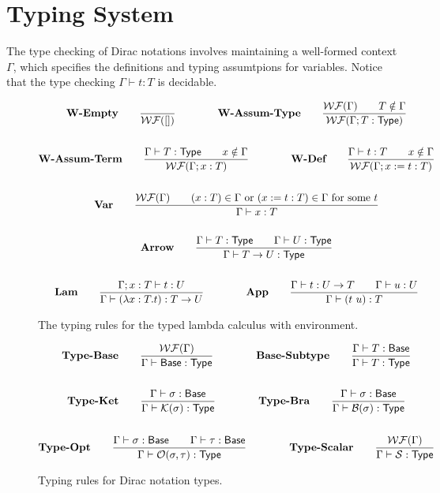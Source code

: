 \documentclass{article}
\begin{document}
\section{Typing System}
The type checking of Dirac notations involves maintaining a well-formed context $\Gamma$, which specifies the definitions and typing assumtpions for variables.
Notice that the type checking $\Gamma \vdash t : T$ is decidable.
\begin{figure}[h]
    \begin{gather*}
        \textbf{W-Empty} \qquad
        \frac{}{\mathcal{WF}([])}
        \qquad \qquad
        \textbf{W-Assum-Type} \qquad
        \frac{\mathcal{WF}(\Gamma) \qquad T \notin \Gamma}{\mathcal{WF}(\Gamma; T:\mathsf{Type})}\\
        \\
        \textbf{W-Assum-Term} \qquad
        \frac{\Gamma\vdash T:\mathsf{Type} \qquad x \notin \Gamma}{\mathcal{WF}(\Gamma; x:T)}
        \qquad \qquad
        \textbf{W-Def} \qquad
        \frac{\Gamma\vdash t:T \qquad x \notin \Gamma}{\mathcal{WF}(\Gamma; x:=t:T)} \\
        \\
        \textbf{Var} \qquad
        \frac{\mathcal{WF}(\Gamma) \qquad (x:T) \in \Gamma \text{ or } (x := t : T) \in \Gamma \text{ for some $t$}}{\Gamma \vdash x : T} \\
        \\
        \textbf{Arrow} \qquad
        \frac{\Gamma \vdash T:\mathsf{Type} \qquad \Gamma \vdash U:\mathsf{Type}}{\Gamma \vdash T \to U : \mathsf{Type}} \\
        \\
        \textbf{Lam} \qquad
        \frac{\Gamma;x:T \vdash t : U}{\Gamma \vdash (\lambda x:T . t) : T \to U}
        \qquad \qquad
        \textbf{App} \qquad
        \frac{\Gamma \vdash t:U \to T \qquad \Gamma \vdash u:U}{\Gamma \vdash (t\ u):T}
    \end{gather*}
    \caption{The typing rules for the typed lambda calculus with environment.}
\end{figure}

\begin{figure}[h]
    \begin{gather*}
        \textbf{Type-Base} \qquad
        \frac{\mathcal{WF}(\Gamma)}{\Gamma \vdash \mathsf{Base} : \mathsf{Type}} 
        \qquad \qquad
        \textbf{Base-Subtype} \qquad
        \frac{\Gamma \vdash T : \mathsf{Base}}{\Gamma \vdash T : \mathsf{Type}} \\
        \\
        \textbf{Type-Ket} \qquad
        \frac{\Gamma \vdash \sigma : \mathsf{Base}}{\Gamma \vdash \mathcal{K}(\sigma) : \mathsf{Type}}
        \qquad \qquad
        \textbf{Type-Bra} \qquad
        \frac{\Gamma \vdash \sigma : \mathsf{Base}}{\Gamma \vdash \mathcal{B}(\sigma) : \mathsf{Type}} \\
        \\
        \textbf{Type-Opt} \qquad
        \frac{\Gamma \vdash \sigma : \mathsf{Base} \qquad \Gamma \vdash \tau : \mathsf{Base}}{\Gamma \vdash \mathcal{O}(\sigma, \tau) : \mathsf{Type}}
        \qquad \qquad
        \textbf{Type-Scalar} \qquad
        \frac{\mathcal{WF}(\Gamma)}{\Gamma \vdash \mathcal{S} : \mathsf{Type}}
    \end{gather*}
    \caption{Typing rules for Dirac notation types.}
\end{figure}
\end{document}
